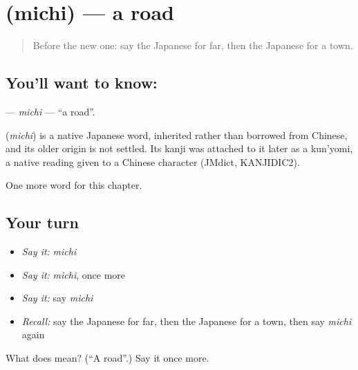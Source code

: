 \section[\texorpdfstring{\ja{みち} (michi)}{みち (michi)}]{ (michi) — a road}

\label{lesson:JA-C57-michi}



\begin{quote}
Before the new one: say the Japanese for far, then the Japanese for a town.
\end{quote}

\subsection*{You'll want to know: }
\textbf{} — \emph{michi} — \textquotedblleft{}a road\textquotedblright{}.

\begin{cousinweb}
\textbf{} (\emph{michi}) is a native Japanese word, inherited rather than borrowed from Chinese, and its older origin is not settled. Its kanji was attached to it later as a kun'yomi, a native reading given to a Chinese character (JMdict, KANJIDIC2).
\end{cousinweb}

\begin{grammarlens}[title={What you've built}]
One more word for this chapter.
\end{grammarlens}

\subsection*{Your turn}
\begin{itemize}
\raggedright
  \item \emph{Say it:} \emph{michi}
  \item \emph{Say it:} \emph{michi}, once more
  \item \emph{Say it:} say \emph{michi}
  \item \emph{Recall:} say the Japanese for far, then the Japanese for a town, then say \emph{michi} again
\end{itemize}

\begin{tcolorbox}[breakable,colback=teal!4,colframe=teal!35!black,title={Before you move on}]
What does  mean? (\textquotedblleft{}A road\textquotedblright{}.) Say it once more.
\end{tcolorbox}
